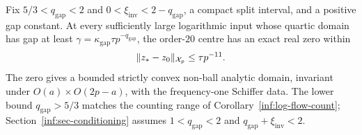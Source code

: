 \begin{theorem}\label{inf:fixed-order-newton}
Fix $5/3<q_{\mathrm{gap}}<2$ and
$0<\xi_{\mathrm{inv}}<2-q_{\mathrm{gap}}$, a compact split interval,
and a positive gap constant. At every sufficiently large logarithmic
input whose quartic domain has gap at least
$\gamma=\kappa_{\mathrm{gap}}\tau p^{-q_{\mathrm{gap}}}$,
the order-$20$ centre has an exact real zero within
\[
 \lVert z_*-z_0\rVert_{\mathcal X_p}\le\tau p^{-11}.
\]
The zero gives a bounded strictly convex non-ball analytic domain,
invariant under $O(a)\times O(2p-a)$, with the frequency-one Schiffer data.
The lower bound $q_{\mathrm{gap}}>5/3$ matches the counting range of
Corollary~\ref{inf:log-flow-count}; Section~\ref{inf:sec-conditioning}
assumes $1<q_{\mathrm{gap}}<2$ and
$q_{\mathrm{gap}}+\xi_{\mathrm{inv}}<2$.
\end{theorem}
